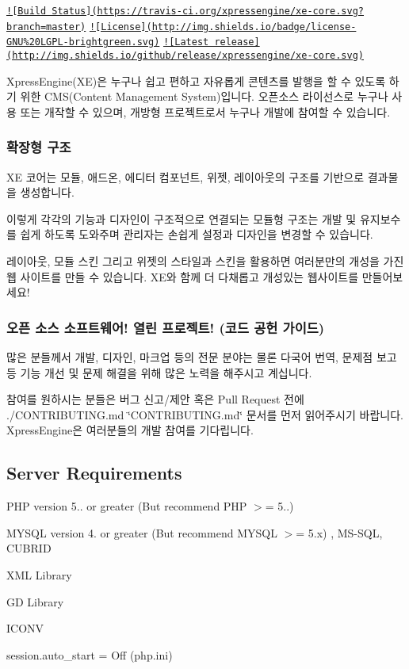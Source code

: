 \href{https://travis-ci.org/xpressengine/xe-core}{\tt !\mbox{[}Build Status\mbox{]}(https\+://travis-\/ci.\+org/xpressengine/xe-\/core.\+svg?branch=master)} \href{http://www.gnu.org/licenses/gpl.html}{\tt !\mbox{[}License\mbox{]}(http\+://img.\+shields.\+io/badge/license-\/\+G\+N\+U\%20\+L\+G\+P\+L-\/brightgreen.\+svg)} \href{https://github.com/xpressengine/xe-core/releases}{\tt !\mbox{[}Latest release\mbox{]}(http\+://img.\+shields.\+io/github/release/xpressengine/xe-\/core.\+svg)}

Xpress\+Engine(\+X\+E)은 누구나 쉽고 편하고 자유롭게 콘텐츠를 발행을 할 수 있도록 하기 위한 C\+M\+S(\+Content Management System)입니다. 오픈소스 라이선스로 누구나 사용 또는 개작할 수 있으며, 개방형 프로젝트로서 누구나 개발에 참여할 수 있습니다.

\subsubsection*{확장형 구조}

X\+E 코어는 모듈, 애드온, 에디터 컴포넌트, 위젯, 레이아웃의 구조를 기반으로 결과물을 생성합니다.

이렇게 각각의 기능과 디자인이 구조적으로 연결되는 모듈형 구조는 개발 및 유지보수를 쉽게 하도록 도와주며 관리자는 손쉽게 설정과 디자인을 변경할 수 있습니다.

레이아웃, 모듈 스킨 그리고 위젯의 스타일과 스킨을 활용하면 여러분만의 개성을 가진 웹 사이트를 만들 수 있습니다. X\+E와 함께 더 다채롭고 개성있는 웹사이트를 만들어보세요!

\subsubsection*{오픈 소스 소프트웨어! 열린 프로젝트! (코드 공헌 가이드)}

많은 분들께서 개발, 디자인, 마크업 등의 전문 분야는 물론 다국어 번역, 문제점 보고 등 기능 개선 및 문제 해결을 위해 많은 노력을 해주시고 계십니다.

참여를 원하시는 분들은 버그 신고/제안 혹은 Pull Request 전에 ./\+C\+O\+N\+T\+R\+I\+B\+U\+T\+I\+N\+G.md \char`\"{}\+C\+O\+N\+T\+R\+I\+B\+U\+T\+I\+N\+G.\+md\char`\"{} 문서를 먼저 읽어주시기 바랍니다. Xpress\+Engine은 여러분들의 개발 참여를 기다립니다.

\subsection*{Server Requirements}


\begin{DoxyItemize}
\item P\+H\+P version 5.. or greater (But recommend P\+H\+P $>$= 5..)
\item M\+Y\+S\+Q\+L version 4. or greater (But recommend M\+Y\+S\+Q\+L $>$= 5.\+x) , M\+S-\/\+S\+Q\+L, C\+U\+B\+R\+I\+D
\item X\+M\+L Library
\item G\+D Library
\item I\+C\+O\+N\+V
\item session.\+auto\+\_\+start = Off (php.\+ini)
\end{DoxyItemize}

